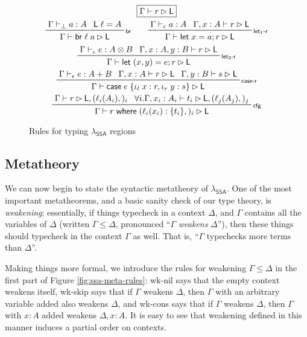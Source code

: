 \documentclass[acmsmall,screen,review]{acmart}
\newcommand{\ms}[1]{\ensuremath{\mathsf{#1}}}
\newcommand{\lto}{:}
\newcommand{\linl}[1]{\iota_l\;{#1}}
\newcommand{\linr}[1]{\iota_r\;{#1}}
\newcommand{\letstmt}[3]{\ensuremath{\ms{let}\;#1 = #2; #3}}
\newcommand{\brb}[2]{\ms{br}\;#1\;#2}
\newcommand{\casestmt}[5]{\ms{case}\;#1\;\{\linl{#2} \lto #3, \linr{#4} \lto #5\}}
\newcommand{\where}[2]{#1\;\ms{where}\;#2}
\newcommand{\wbranch}[3]{#1(#2) \lto \{#3\}}
\newcommand{\bhyp}[2]{#1 : #2}
\newcommand{\lhyp}[2]{#1(#2)}
\newcommand{\rle}[1]{{\scriptsize\textsf{#1}}}
\newcommand{\hasty}[4]{#1 \vdash_{#2} #3: {#4}}
\newcommand{\haslb}[3]{#1 \vdash #2 \rhd #3}
\newcommand{\brle}[1]{{\textsf{#1}}}
\newcommand{\isotopessa}{\(\lambda_{\ms{SSA}}\)}
\begin{document}
\begin{figure}
  \begin{gather*}
    \boxed{\haslb{\Gamma}{r}{\ms{L}}} \\
    \prftree[r]{\rle{br}}{\hasty{\Gamma}{\bot}{a}{A}}{\ms{L}\;\ell = A}
      {\haslb{\Gamma}{\brb{\ell}{a}}{\ms{L}}} \qquad
    \prftree[r]{\rle{let$_1$-r}}
      {\hasty{\Gamma}{\epsilon}{a}{A}}
      {\haslb{\Gamma, \bhyp{x}{A}}{r}{\ms{L}}}
      {\haslb{\Gamma}{\letstmt{x}{a}{r}}{\ms{L}}} \\
    \prftree[r]{\rle{let$_2$-r}}
      {\hasty{\Gamma}{\epsilon}{e}{A \otimes B}}
      {\haslb{\Gamma, \bhyp{x}{A}, \bhyp{y}{B}}{r}{\ms{L}}}
      {\haslb{\Gamma}{\letstmt{(x, y)}{e}{r}}{\ms{L}}} \\
    \prftree[r]{\rle{case-r}}
      {\hasty{\Gamma}{\epsilon}{e}{A + B}}
      {\haslb{\Gamma, \bhyp{x}{A}}{r}{\ms{L}}}
      {\haslb{\Gamma, \bhyp{y}{B}}{s}{\ms{L}}}
      {\haslb{\Gamma}{\casestmt{e}{x}{r}{y}{s}}{\ms{L}}} \\
    \prftree[r]{\rle{cfg}}
      {\haslb{\Gamma}{r}{\ms{L}, (\lhyp{\ell_i}{A_i},)_i}}
      {\forall i. \haslb{\Gamma, \bhyp{x_i}{A_i}}{t_i}{\ms{L}, (\lhyp{\ell_j}{A_j},)_j}}
      {\haslb{\Gamma}{\where{r}{(\wbranch{\ell_i}{x_i}{t_i},)_i}}{\ms{L}}}
  \end{gather*}
  \caption{Rules for typing \isotopessa{} regions}
  \Description{}
  \label{fig:ssa-reg-rules}
\end{figure}

\subsection{Metatheory}

We can now begin to state the syntactic metatheory of \isotopessa{}. One of the most important
metatheorems, and a basic sanity check of our type theory, is \emph{weakening}; essentially, if
things typecheck in a context $\Delta$, and $\Gamma$ contains all the variables of $\Delta$ (written
$\Gamma \leq \Delta$, pronounced ``$\Gamma$ \emph{weakens} $\Delta$''), then these things should
typecheck in the context $\Gamma$ as well. That is, ``$\Gamma$ typechecks more terms than
$\Delta$''.
 
Making things more formal, we introduce the rules for weakening $\Gamma \leq \Delta$ in the first
part of Figure \ref{fig:ssa-meta-rules}: \brle{wk-nil} says that the empty context weakens itself,
\brle{wk-skip} says that if $\Gamma$ weakens $\Delta$, then $\Gamma$ with an arbitrary variable
added also weakens $\Delta$, and \brle{wk-cons} says that if $\Gamma$ weakens $\Delta$, then
$\Gamma$ with $\bhyp{x}{A}$ added weakens $\Delta, \bhyp{x}{A}$. It is easy to see that weakening
defined in this manner induces a partial order on contexts.
\end{document}

